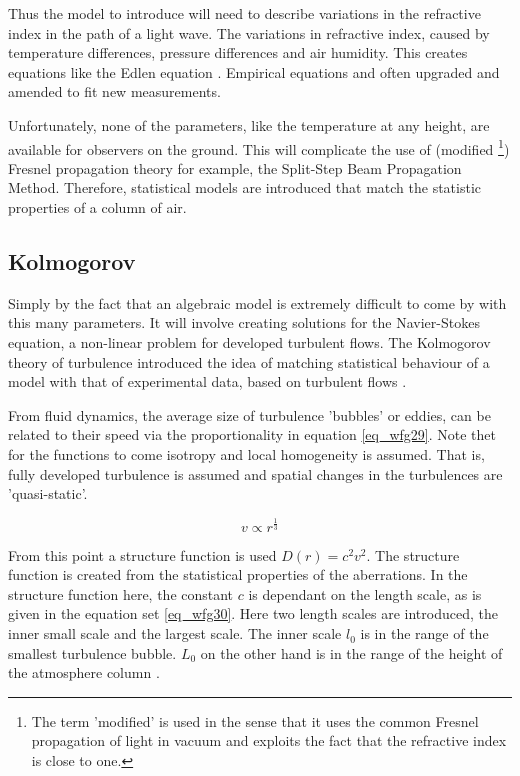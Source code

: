 \documentclass{article}
\begin{document}
Thus the model to introduce will need to describe variations in the refractive index in the path of a light wave. The variations in refractive index, caused by temperature differences, pressure differences and air humidity. This creates equations like the Edlen equation \cite{edlen1966}. Empirical equations and often upgraded and amended to fit new measurements. 

Unfortunately, none of the parameters, like the temperature at any height, are available for observers on the ground. This will complicate the use of (modified \footnote{The term 'modified' is used in the sense that it uses the common Fresnel propagation of light in vacuum and exploits the fact that the refractive index is close to one.}) Fresnel propagation theory for example, the Split-Step Beam Propagation Method. Therefore, statistical models are introduced that match the statistic properties of a column of air.

\subsection{Kolmogorov}
Simply by the fact that an algebraic model is extremely difficult to come by with this many parameters. It will involve creating solutions for the Navier-Stokes equation, a non-linear problem for developed turbulent flows.
The Kolmogorov theory of turbulence introduced the idea of matching statistical behaviour of a model with that of experimental data, based on turbulent flows \cite{kolmogorov1941local}. 

From fluid dynamics, the average size of turbulence 'bubbles' or eddies, can be related to their speed via the proportionality in equation \ref{eq_wfg29}. Note thet for the functions to come isotropy and local homogeneity  is assumed. That is, fully developed turbulence is assumed and spatial changes in the turbulences are 'quasi-static'.

\begin{equation}
v \propto r^{\frac{1}{3}}
\label{eq_wfg29}
\end{equation}

\newpage
From this point a structure function is used $D(r) = c^2 v^2$. The structure function is created from the statistical properties of the aberrations.  In the structure function here, the constant $c$ is dependant on the length scale, as is given in the equation set \ref{eq_wfg30}. Here two length scales are introduced, the inner small scale and the largest scale. The inner scale $l_0$ is in the range of the smallest turbulence bubble. $L_0$ on the other hand is in the range of the height of the atmosphere column \cite{zernikeMatlab}.
\end{document}
